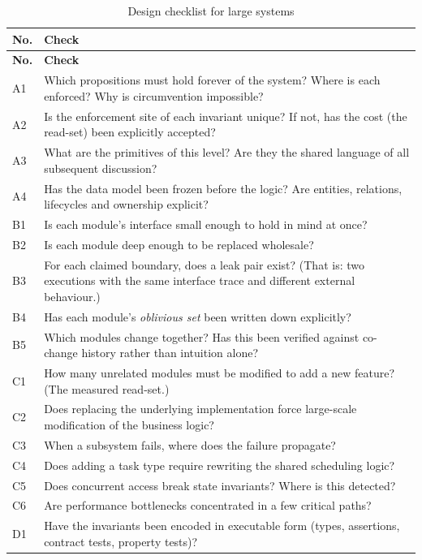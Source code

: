 {\small\begin{longtable}{L{1.0cm}L{14.0cm}}
\caption{Design checklist for large systems}\label{tab:checklist}\\
\toprule
\textbf{No.} & \textbf{Check} \\
\midrule
\endfirsthead
\toprule
\textbf{No.} & \textbf{Check} \\
\midrule
\endhead
\bottomrule
\endlastfoot
A1 & Which propositions must hold forever of the system? Where is each enforced? Why is circumvention impossible?\\
A2 & Is the enforcement site of each invariant unique? If not, has the cost (the read-set) been explicitly accepted?\\
A3 & What are the primitives of this level? Are they the shared language of all subsequent discussion?\\
A4 & Has the data model been frozen before the logic? Are entities, relations, lifecycles and ownership explicit?\\
\midrule
B1 & Is each module's interface small enough to hold in mind at once?\\
B2 & Is each module deep enough to be replaced wholesale?\\
B3 & For each claimed boundary, does a leak pair exist? (That is: two executions with the same interface trace and different external behaviour.)\\
B4 & Has each module's \emph{oblivious set} been written down explicitly?\\
B5 & Which modules change together? Has this been verified against co-change history rather than intuition alone?\\
\midrule
C1 & How many unrelated modules must be modified to add a new feature? (The measured read-set.)\\
C2 & Does replacing the underlying implementation force large-scale modification of the business logic?\\
C3 & When a subsystem fails, where does the failure propagate?\\
C4 & Does adding a task type require rewriting the shared scheduling logic?\\
C5 & Does concurrent access break state invariants? Where is this detected?\\
C6 & Are performance bottlenecks concentrated in a few critical paths?\\
\midrule
D1 & Have the invariants been encoded in executable form (types, assertions, contract tests, property tests)?\\

\end{longtable}}
